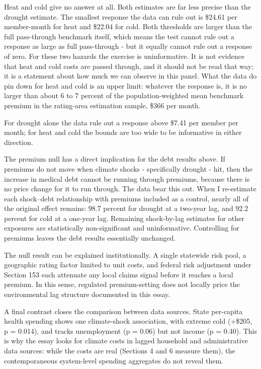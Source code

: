 \documentclass[a4paper,11pt]{report}
\begin{document}
Heat and cold give no answer at all. Both estimates are far less precise than the drought estimate. The smallest response the data can rule out is \$24.61 per member-month for heat and \$22.04 for cold. Both thresholds are larger than the full pass-through benchmark itself, which means the test cannot rule out a response as large as full pass-through - but it equally cannot rule out a response of zero. For these two hazards the exercise is uninformative. It is not evidence that heat and cold costs are passed through, and it should not be read that way; it is a statement about how much we can observe in this panel. What the data do pin down for heat and cold is an upper limit: whatever the response is, it is no larger than about 6 to 7 percent of the population-weighted mean benchmark premium in the rating-area estimation sample, \$366 per month.

For drought alone the data rule out a response above \$7.41 per member per month; for heat and cold the bounds are too wide to be informative in either direction.

The premium null has a direct implication for the debt results above. If premiums do not move when climate shocks - specifically drought - hit, then the increase in medical debt cannot be running through premiums, because there is no price change for it to run through. The data bear this out. When I re-estimate each shock--debt relationship with premiums included as a control, nearly all of the original effect remains: 98.7 percent for drought at a two-year lag, and 92.2 percent for cold at a one-year lag. Remaining shock-by-lag estimates for other exposures are statistically non-significant and uninformative. Controlling for premiums leaves the debt results essentially unchanged.

The null result can be explained institutionally. A single statewide risk pool, a geographic rating factor limited to unit costs, and federal risk adjustment under Section 153 each attenuate any local claims signal before it reaches a local premium. \citep{kautter2014hhshcc} In this sense, regulated premium-setting does not locally price the environmental lag structure documented in this essay.

A final contrast closes the comparison between data sources. State per-capita health spending shows one climate-shock association, with extreme cold (+\$205, p = 0.014), and tracks unemployment (p = 0.06) but not income (p = 0.40). This is why the essay looks for climate costs in lagged household and administrative data sources: while the costs are real (Sections 4 and 6 measure them),  the contemporaneous system-level spending aggregates do not reveal them.
\end{document}
